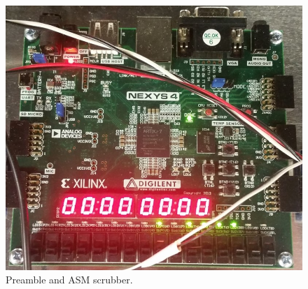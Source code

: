 \begin{figure}
	\centering\includegraphics[scale=0.5]{figures/eq_GPUimplementation/scrubber.jpg}
	\caption{Preamble and ASM scrubber.}
	\label{fig:scrubber}
\end{figure}












